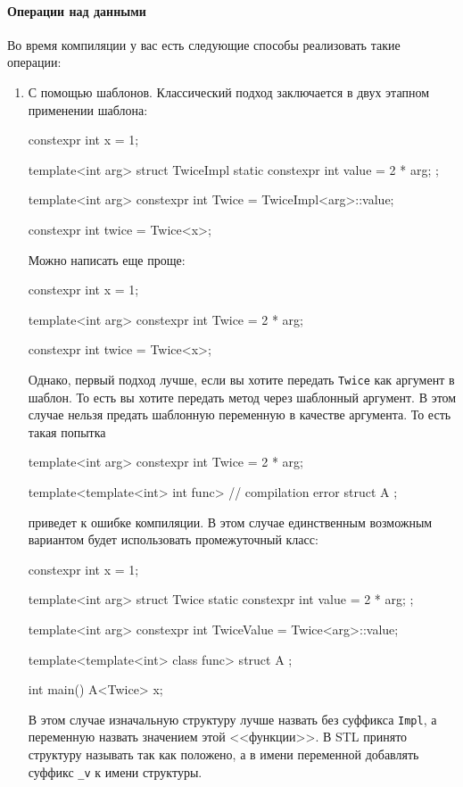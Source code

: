 \paragraph{Операции над данными}

Во время компиляции у вас есть следующие способы реализовать такие операции:
\begin{enumerate}
\item С помощью шаблонов.
Классический подход заключается в двух этапном применении шаблона:
\begin{cppcode}
constexpr int x = 1;

template<int arg>
struct TwiceImpl {
  static constexpr int value = 2 * arg;
};

template<int arg>
constexpr int Twice = TwiceImpl<arg>::value;

constexpr int twice = Twice<x>;
\end{cppcode}
Можно написать еще проще:
\begin{cppcode}
constexpr int x = 1;

template<int arg>
constexpr int Twice = 2 * arg;

constexpr int twice = Twice<x>;
\end{cppcode}
Однако, первый подход лучше, если вы хотите передать \verb"Twice" как аргумент в шаблон.
То есть вы хотите передать метод через шаблонный аргумент.
В этом случае нельзя предать шаблонную переменную в качестве аргумента.
То есть такая попытка
\begin{cppcode}
template<int arg>
constexpr int Twice = 2 * arg;

template<template<int> int func> // compilation error
struct A {};
\end{cppcode}
приведет к ошибке компиляции.
В этом случае единственным возможным вариантом будет использовать промежуточный класс:
\begin{cppcode}
constexpr int x = 1;

template<int arg>
struct Twice {
  static constexpr int value = 2 * arg;
};

template<int arg>
constexpr int TwiceValue = Twice<arg>::value;

template<template<int> class func>
struct A {};

int main() {
  A<Twice> x;
}
\end{cppcode}
В этом случае изначальную структуру лучше назвать без суффикса \verb"Impl", а переменную назвать значением этой <<функции>>.
В STL принято структуру называть так как положено, а в имени переменной добавлять суффикс \verb"_v" к имени структуры.


\end{enumerate}
